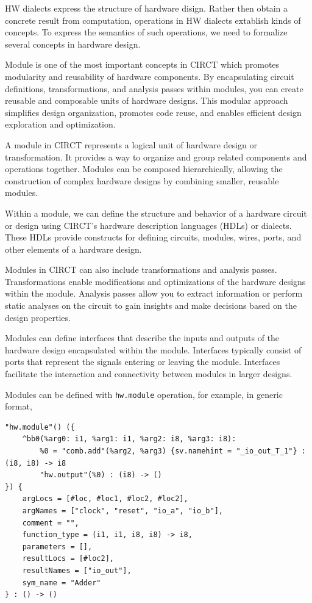 HW dialects express the structure of hardware disign. Rather then obtain a concrete result from computation, operations in HW dialects extablish kinds of concepts. To express the semantics of such operations, we need to formalize several concepts in hardware design.

Module is one of the most important concepts in CIRCT which promotes modularity and reusability of hardware components. By encapsulating circuit definitions, transformations, and analysis passes within modules, you can create reusable and composable units of hardware designs. This modular approach simplifies design organization, promotes code reuse, and enables efficient design exploration and optimization.

A module in CIRCT represents a logical unit of hardware design or transformation. It provides a way to organize and group related components and operations together. Modules can be composed hierarchically, allowing the construction of complex hardware designs by combining smaller, reusable modules.

Within a module, we can define the structure and behavior of a hardware circuit or design using CIRCT's hardware description languages (HDLs) or dialects. These HDLs provide constructs for defining circuits, modules, wires, ports, and other elements of a hardware design.

Modules in CIRCT can also include transformations and analysis passes. Transformations enable modifications and optimizations of the hardware designs within the module. Analysis passes allow you to extract information or perform static analyses on the circuit to gain insights and make decisions based on the design properties.

Modules can define interfaces that describe the inputs and outputs of the hardware design encapsulated within the module. Interfaces typically consist of ports that represent the signals entering or leaving the module. Interfaces facilitate the interaction and connectivity between modules in larger designs.

Modules can be defined with \verb|hw.module| operation, for example, in generic format,
\begin{lstlisting}
"hw.module"() ({
    ^bb0(%arg0: i1, %arg1: i1, %arg2: i8, %arg3: i8):
        %0 = "comb.add"(%arg2, %arg3) {sv.namehint = "_io_out_T_1"} : (i8, i8) -> i8
        "hw.output"(%0) : (i8) -> ()
}) {
    argLocs = [#loc, #loc1, #loc2, #loc2], 
    argNames = ["clock", "reset", "io_a", "io_b"], 
    comment = "", 
    function_type = (i1, i1, i8, i8) -> i8, 
    parameters = [], 
    resultLocs = [#loc2], 
    resultNames = ["io_out"], 
    sym_name = "Adder"
} : () -> ()
\end{lstlisting}


